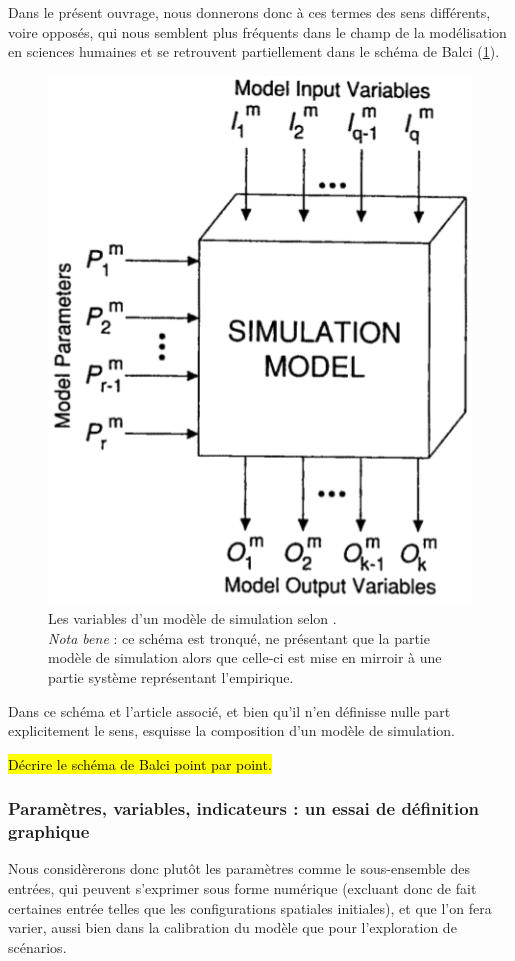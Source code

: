 Dans le présent ouvrage, nous donnerons donc à ces termes des sens différents, voire opposés, qui nous semblent plus fréquents dans le champ de la modélisation en sciences humaines et se retrouvent partiellement dans le schéma de Balci (\cref{fig:parametres-Balci}).
\begin{figure}[!h]
	\includegraphics[width=.4\linewidth]{img/Balci1994a_Figure_Parametres.png}
	\caption[Les variables d'un modèle de simulation selon \citeauthor{balci_validation_1994}]{Les variables d'un modèle de simulation selon \textcite[122]{balci_validation_1994}.\\
		\textit{Nota bene} : ce schéma est tronqué, ne présentant que la partie \og modèle de simulation\fg{} alors que celle-ci est mise en mirroir à une partie \og système\fg{} représentant l'empirique.}
	\label{fig:parametres-Balci} 
\end{figure}

Dans ce schéma et l'article associé, et bien qu'il n'en définisse nulle part explicitement le sens, \citeauthor{balci_validation_1994} esquisse la composition d'un modèle de simulation.

\begin{center}
\hl{
	Décrire le schéma de Balci point par point.
}
\end{center}


\subsubsection{Paramètres, variables, indicateurs : un essai de définition graphique}
\label{subsubsec:mes_definitions_params}

Nous considèrerons donc plutôt les paramètres comme le sous-ensemble des entrées, qui peuvent s'exprimer sous forme numérique (excluant donc de fait certaines entrée telles que les configurations spatiales initiales), et que l'on fera varier, aussi bien dans la calibration du modèle que pour l'exploration de scénarios.


